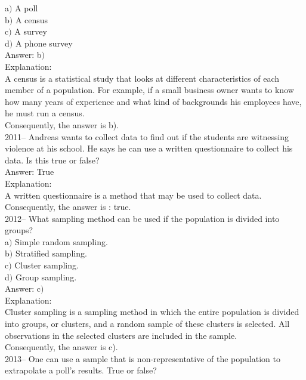 \documentclass[letterpaper, 12pt]{article}
\begin{document}
a$)$ A poll\\
b$)$ A census\\
c$)$ A survey\\
d$)$ A phone survey\\

Answer: b$)$\\

Explanation:\\
A census is a statistical study that looks at different characteristics of each member of a population. For example, if a small business owner wants to know how many years of experience and what kind of backgrounds his employees have, he must run a census. \\
Consequently, the answer is b).\\

2011-- Andreas wants to collect data to find out if the students are witnessing violence at his school. He says he can use a written questionnaire to collect his data. Is this true or false?\\

Answer: True\\

Explanation:\\
A written questionnaire is a method that may be used to collect data. \\
Consequently, the answer is : true.\\


2012-- What sampling method can be used if the population is divided into groups? \\

a$)$ Simple random sampling.\\
b$)$ Stratified sampling.\\
c$)$ Cluster sampling.\\
d$)$ Group sampling.\\


Answer: c$)$\\

Explanation:\\
Cluster sampling is a sampling method in which the entire population is divided into groups, or clusters, and a random sample of these clusters is selected. All observations in the selected clusters are included in the sample.\\
Consequently, the answer is c).\\

2013-- One can use a sample that is non-representative of the population to extrapolate a poll's results. True or false? \\
\end{document}
